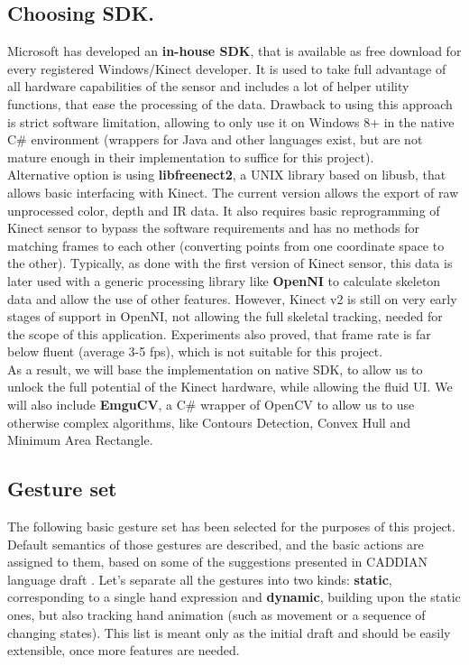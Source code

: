 \documentclass[a4paper,11pt,oneside]{article}
\begin{document}
\subsection{Choosing SDK.}

Microsoft has developed an \textbf{in-house SDK}, that is available as free download for every registered Windows/Kinect developer. It is used to take full advantage of all hardware capabilities of the sensor and includes a lot of helper utility functions, that ease the processing of the data. Drawback to using this approach is strict software limitation, allowing to only use it on Windows 8+ in the native C\# environment (wrappers for Java and other languages exist, but are not mature enough in their implementation to suffice for this project).\\

Alternative option is using \textbf{libfreenect2}, a UNIX library based on libusb, that allows basic interfacing with Kinect. The current version allows the export of raw unprocessed color, depth and IR data. It also requires basic reprogramming of Kinect sensor to bypass the software requirements and has no methods for matching frames to each other (converting points from one coordinate space to the other). Typically, as done with the first version of Kinect sensor, this data is later used with a generic processing library like \textbf{OpenNI} to calculate skeleton data and allow the use of other features. However, Kinect v2 is still on very early stages of support in OpenNI, not allowing the full skeletal tracking, needed for the scope of this application. Experiments also proved, that frame rate is far below fluent (average 3-5 fps), which is not suitable for this project.\\

As a result, we will base the implementation on native SDK, to allow us to unlock the full potential of the Kinect hardware, while allowing the fluid UI. We will also include \textbf{EmguCV}, a C\# wrapper of OpenCV to allow us to use otherwise complex algorithms, like Contours Detection, Convex Hull and Minimum Area Rectangle.
 
  \subsection{Gesture set}
	
    The following basic gesture set has been selected for the purposes of this project. Default semantics of those gestures are described, and the basic actions are assigned to them, based on some of the suggestions presented in CADDIAN language draft \cite{AB01}. Let's separate all the gestures into two kinds: \textbf{static}, corresponding to a single hand expression and \textbf{dynamic},  building upon the static ones, but also tracking hand animation (such as movement or a sequence of changing states). This list is meant only as the initial draft and should be easily extensible, once more features are needed.
    
\end{document}
